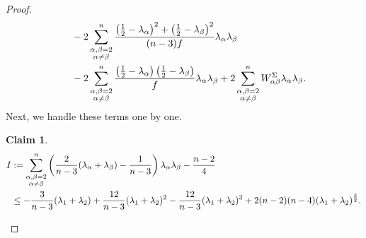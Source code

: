 \documentclass[a4, 12pt]{amsart}
\theoremstyle{plain}
\newtheorem{claim}{Claim}[section]
\begin{document}
\begin{proof}
\begin{equation*}
\begin{aligned}
		&\quad - 2\sum_{\substack{\alpha,\beta=2 \\ \alpha\neq\beta}}^n \frac{\left(\frac{1}{2} - \lambda_{\alpha}\right)^2 + \left(\frac{1}{2} - \lambda_{\beta}\right)^2}{(n-3)f}\lambda_\alpha\lambda_\beta \notag \\
		&\quad - 2\sum_{\substack{\alpha,\beta=2 \\ \alpha\neq\beta}}^n \frac{\left(\frac{1}{2} - \lambda_{\alpha}\right)\left(\frac{1}{2} - \lambda_{\beta}\right)}{f}\lambda_\alpha\lambda_\beta + 2\sum_{\substack{\alpha,\beta=2 \\ \alpha\neq\beta}}^n W^{\Sigma}_{\alpha\beta}\lambda_\alpha\lambda_\beta. \label{eq:gradient-decomposition}
	\end{aligned}
\end{equation*}
	Next, we handle these terms one by one.
	
	\begin{claim}\label{claim:I}
		\begin{equation*}
			\begin{aligned}
			I &:= \sum_{\substack{\alpha,\beta=2 \\ \alpha\neq\beta}}^n \left(\frac{2}{n-3}(\lambda_{\alpha} + \lambda_{\beta}) - \frac{1}{n-3}\right)\lambda_{\alpha}\lambda_{\beta} - \frac{n-2}{4} \notag \\
			&\leq -\frac{3}{n-3}(\lambda_{1}+\lambda_{2}) + \frac{12}{n-3}(\lambda_{1}+\lambda_{2})^2 - \frac{12}{n-3}(\lambda_{1}+\lambda_{2})^3 + 2(n-2)(n-4)(\lambda_{1}+\lambda_{2})^{\frac{3}{2}}. %
		\end{aligned}
		\end{equation*}
	\end{claim}
	

\end{proof}
\end{document}
